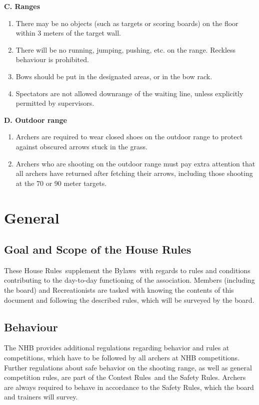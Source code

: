 \documentclass[a4paper]{article}
\newcommand{\Asta}{Bylaws} %
\newcommand{\Ahr}{House Rules} %
\newcommand{\Asr}{Safety Rules} %
\newcommand{\Awr}{Contest Rules} %
\begin{document}
{\bf C. Ranges}

\begin{enumerate}
  \item There may be no objects (such as targets or scoring boards) on the floor within 3 meters of the target wall.
  \item There will be no running, jumping, pushing, etc. on the range. Reckless behaviour is prohibited.
  \item Bows should be put in the designated areas, or in the bow rack.
  \item Spectators are not allowed downrange of the waiting line, unless explicitly permitted by supervisors.
\end{enumerate}



{\bf D. Outdoor range}

\begin{enumerate}
  \item Archers are required to wear closed shoes on the outdoor range to protect against obscured arrows stuck in the grass.
  \item Archers who are shooting on the outdoor range must pay extra attention that all archers have returned after fetching their arrows, including those shooting at the 70 or 90 meter targets.
\end{enumerate}

\section{General}
\subsection{Goal and Scope of the \Ahr}
These \Ahr\ supplement the \Asta\ with regards to rules and conditions contributing to the day-to-day functioning of the association. Members (including the board) and Recreationists are tasked with knowing the contents of this document and following the described rules, which will be surveyed by the board. \\

\subsection{Behaviour}
The NHB provides additional regulations regarding behavior and rules at competitions, which have to be followed by all archers at NHB competitions. Further regulations about safe behavior on the shooting range, as well as general competition rules, are part of the \Awr\ and the \Asr . Archers are always required to behave in accordance to the \Asr , which the board and trainers will survey. \\
\end{document}

